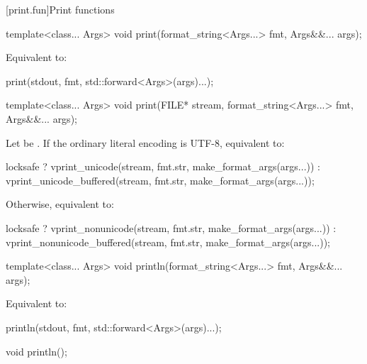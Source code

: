 [print.fun]{Print functions}

%
\begin{itemdecl}
template<class... Args>
  void print(format_string<Args...> fmt, Args&&... args);
\end{itemdecl}

\begin{itemdescr}
\pnum
\effects
Equivalent to:
\begin{codeblock}
print(stdout, fmt, std::forward<Args>(args)...);
\end{codeblock}
\end{itemdescr}

%
\begin{itemdecl}
template<class... Args>
  void print(FILE* stream, format_string<Args...> fmt, Args&&... args);
\end{itemdecl}

\begin{itemdescr}
\pnum
\effects
Let  be
.
If the ordinary literal encoding is UTF-8, equivalent to:
\begin{codeblock}
locksafe
  ? vprint_unicode(stream, fmt.str, make_format_args(args...))
  : vprint_unicode_buffered(stream, fmt.str, make_format_args(args...));
\end{codeblock}
Otherwise, equivalent to:
\begin{codeblock}
locksafe
  ? vprint_nonunicode(stream, fmt.str, make_format_args(args...))
  : vprint_nonunicode_buffered(stream, fmt.str, make_format_args(args...));
\end{codeblock}
\end{itemdescr}

%
\begin{itemdecl}
template<class... Args>
  void println(format_string<Args...> fmt, Args&&... args);
\end{itemdecl}

\begin{itemdescr}
\pnum
\effects
Equivalent to:
\begin{codeblock}
println(stdout, fmt, std::forward<Args>(args)...);
\end{codeblock}
\end{itemdescr}

%
\begin{itemdecl}
void println();
\end{itemdecl}

